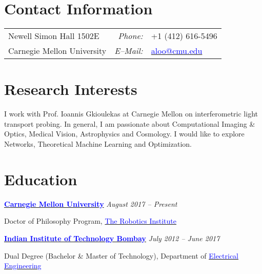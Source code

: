 \documentclass[margin,line]{res}
\newenvironment{list1}{
  \begin{list}{\ding{113}}{%
      \setlength{\itemsep}{0in}
      \setlength{\parsep}{0in} \setlength{\parskip}{0in}
      \setlength{\topsep}{0in} \setlength{\partopsep}{0in} 
      \setlength{\leftmargin}{0.17in}}}{\end{list}}
\begin{document}

\begin{resume}

\section{\sc Contact Information}
\vspace{.05in}
\begin{tabular}{@{}p{2.9in}p{.5in}p{3in}}
Newell Simon Hall 1502E & \multicolumn{1}{r}{\it Phone:}  & +1 (412) 616-5496 \\            
Carnegie Mellon University &\multicolumn{1}{r}{\it E--Mail:}& \href{mailto:aloo@cmu.edu}{\textcolor{blue}{aloo@cmu.edu}} \\ 
\end{tabular}


\section{\sc Research Interests}
I work with Prof. Ioannis Gkioulekas at Carnegie Mellon on interferometric light transport probing. In general, I am passionate about Computational Imaging \& Optics, Medical Vision, Astrophysics and Cosmology. I would like to explore Networks, Theoretical Machine Learning and Optimization.


\section{\sc Education}
{\bf \href{http://www.cmu.edu/}{\textcolor{blue}{Carnegie Mellon University}}} \hfill {\it August 2017 -- Present} \\
\vspace*{-.1in}
\begin{list1}
\item[] Doctor of Philosophy Program, \href{http://www.ri.cmu.edu/}{\textcolor{blue}{The Robotics Institute}}
\end{list1}
\vspace*{-.1in}
{\bf \href{http://www.iitb.ac.in/}{\textcolor{blue}{Indian Institute of Technology Bombay}}} \hfill {\it July 2012 -- June 2017} \\
\vspace*{-.1in}
\begin{list1}
\item[] Dual Degree (Bachelor \& Master of Technology), Department of \href{http://www.ee.iitb.ac.in/}{\textcolor{blue}{Electrical Engineering}}
\end{list1}


\end{resume}
\end{document}
